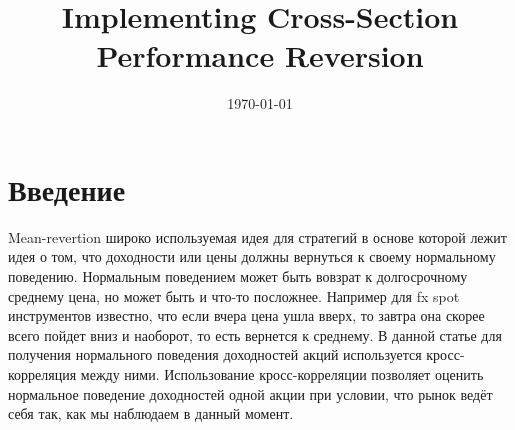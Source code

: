 \documentclass[10pt, a4paper, twocolumn]{article} %
\title{Implementing Cross-Section Performance Reversion} %
\author{
	\authorstyle{Valery Ovchinnikov} %
}
\date{\today} %
\begin{document}
\maketitle %

\thispagestyle{firstpage} %



\section{Введение}
Mean-revertion широко используемая идея для стратегий в основе которой лежит идея о том, что доходности или цены должны
вернуться к своему нормальному поведению. Нормальным поведением может быть вовзрат к долгосрочному среднему цена,
но может быть и что-то посложнее. Например для fx spot инструментов известно, что  если вчера цена ушла вверх, то завтра
она скорее всего пойдет вниз и наоборот, то есть вернется к среднему. В данной статье для получения нормального
поведения доходностей акций используется кросс-корреляция между ними. Использование кросс-корреляции позволяет оценить
нормальное поведение доходностей одной акции при условии, что рынок ведёт себя так, как мы наблюдаем в данный момент.
\end{document}
